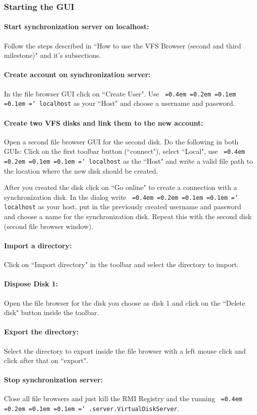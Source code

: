\documentclass[a4paper,12pt]{article}
\newcommand*\justify{%
  \fontdimen2\font=0.4em%
  \fontdimen3\font=0.2em%
  \fontdimen4\font=0.1em%
  \fontdimen7\font=0.1em%
  \hyphenchar\font=`\-%
}
\newcommand{\mono}[1]{\texttt{\justify #1}}
\begin{document}
\subsubsection{Starting the GUI}
\paragraph{Start synchronization server on localhost:} Follow the steps described in ``How to use the VFS Browser (second and third milestone)" and it's subsections.

\paragraph{Create account on synchronization server:} In the file browser GUI click on ``Create User". Use \mono{localhost} as your ``Host" and choose a username and password.

\paragraph{Create two VFS disks and link them to the new account:} Open a second file browser GUI for the second disk. Do the following in both GUIs: Click on the first toolbar button (``connect"), select ``Local", use \mono{localhost} as the ``Host" and write a valid file path to the location where the new disk should be created.

After you created the disk click on ``Go online" to create a connection with a synchronization disk. In the dialog write \mono{localhost} as your host, put in the previously created username and password and choose a name for the synchronization disk. Repeat this with the second disk (second file browser window).

\paragraph{Import a directory:} Click on ``Import directory" in the toolbar and select the directory to import.

\paragraph{Dispose Disk 1:} Open the file browser for the disk you choose as disk 1 and click on the ``Delete disk" button inside the toolbar.

\paragraph{Export the directory:} Select the directory to export inside the file browser with a left mouse click and click after that on ``export".

\paragraph{Stop synchronization server:} Close all file browsers and just kill the RMI Registry and the running \mono{.server.VirtualDiskServer}.
\end{document}
